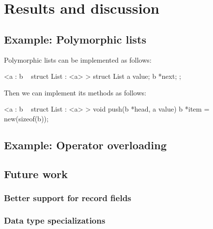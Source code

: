 
\chapter{Results and discussion}

\section{Example: Polymorphic lists}

Polymorphic lists can be implemented as follows:

<a : b ~ struct List : <a> >
struct List
{
    a value;
    b *next;
};

Then we can implement its methods as follows:

<a : b ~ struct List : <a> >
void push(b *head, a value)
{
    b *item = new(sizeof(b));
}

\section{Example: Operator overloading}

\section{Future work}

\subsection{Better support for record fields}

\subsection{Data type specializations}

